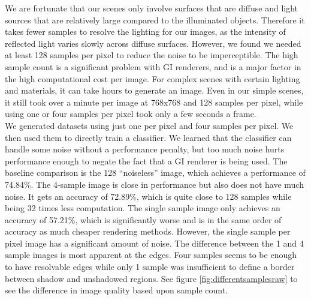 \documentclass[10pt,twocolumn,letterpaper]{article}
\begin{document}
We are fortunate that our scenes only involve surfaces that are diffuse and light sources that are relatively large compared to the illuminated objects.  Therefore it takes fewer samples to resolve the lighting for our images, as the intensity of reflected light varies slowly across diffuse surfaces.  However, we found we needed at least 128 samples per pixel to reduce the noise to be imperceptible. The high sample count is a significant problem with GI renderers, and is a major factor in the high computational cost per image.  For complex scenes with certain lighting and materials, it can take hours to generate an image.  Even in our simple scenes, it still took over a minute per image at 768x768 and 128 samples per pixel, while using one or four samples per pixel took only a few seconds a frame.\\

We generated datasets using just one per pixel and four samples per pixel. We then used them to directly train a classifier.  We learned that the classifier can handle some noise without a performance penalty,  but too much noise hurts performance enough to negate the fact that a GI renderer is being used.  The baseline comparison is the 128 ``noiseless'' image, which achieves a performance of 74.84\%.  The 4-sample image is close in performance but also does not have much noise.  It gets an accuracy of 72.89\%, which is quite close to 128 samples while being 32 times less computation.  The single sample image only achieves an accuracy of 57.21\%, which is significantly worse and is in the same order of accuracy as much cheaper rendering methods.  However, the single sample per pixel image has a significant amount of noise.  The difference between the 1 and 4 sample images is most apparent at the edges. Four samples seems to be enough to have resolvable edges while only 1 sample was insufficient to define a border between shadow and unshadowed regions. See figure \ref{fig:differentsamplesraw} to see the difference in image quality based upon sample count. 
\end{document}

